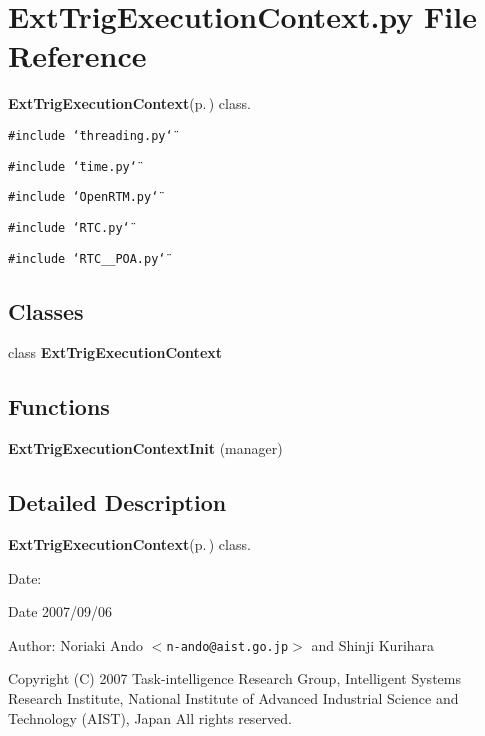 \section{Ext\-Trig\-Execution\-Context.py File Reference}
\label{ExtTrigExecutionContext_8py}
{\bf Ext\-Trig\-Execution\-Context}{\rm (p.\,\pageref{classExtTrigExecutionContext})} class. 

{\tt \#include \char`\"{}threading.py\char`\"{}}\par
{\tt \#include \char`\"{}time.py\char`\"{}}\par
{\tt \#include \char`\"{}Open\-RTM.py\char`\"{}}\par
{\tt \#include \char`\"{}RTC.py\char`\"{}}\par
{\tt \#include \char`\"{}RTC\_\-\_\-POA.py\char`\"{}}\par
\subsection*{Classes}
\begin{CompactItemize}
\item 
class {\bf Ext\-Trig\-Execution\-Context}
\end{CompactItemize}
\subsection*{Functions}
\begin{CompactItemize}
\item 
{\bf Ext\-Trig\-Execution\-Context\-Init} (manager)
\end{CompactItemize}


\subsection{Detailed Description}
{\bf Ext\-Trig\-Execution\-Context}{\rm (p.\,\pageref{classExtTrigExecutionContext})} class. 

\begin{Desc}
\item[Date:]\begin{Desc}
\item[Date]2007/09/06\end{Desc}
\end{Desc}
\begin{Desc}
\item[Author:]Noriaki Ando $<${\tt n-ando@aist.go.jp}$>$ and Shinji Kurihara\end{Desc}
Copyright (C) 2007 Task-intelligence Research Group, Intelligent Systems Research Institute, National Institute of Advanced Industrial Science and Technology (AIST), Japan All rights reserved.

